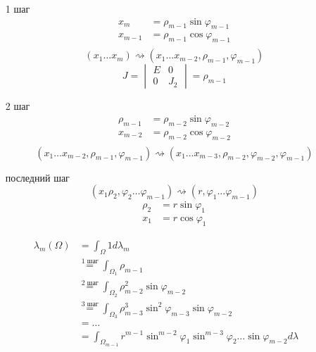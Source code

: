 \begin{itemize}
    \item [1 шаг] \begin{align*}
              x_m       & = \rho_{m - 1} \sin \varphi_{m - 1} \\
              x_{m - 1} & = \rho_{m - 1} \cos \varphi_{m - 1} \\
          \end{align*}
          \[(x_1 \dots x_m) \rightsquigarrow (x_1 \dots x_{m - 2}, \rho_{m - 1}, \varphi_{m - 1})\]
          \[J = \begin{vmatrix} E & 0 \\ 0 & J_2 \end{vmatrix} = \rho_{m - 1}\]
    \item [2 шаг] \begin{align*}
              \rho_{m - 1} & = \rho_{m - 2} \sin \varphi_{m - 2} \\
              x_{m - 2}    & = \rho_{m - 2} \cos \varphi_{m - 2} \\
          \end{align*}
          \[(x_1 \dots x_{m - 2}, \rho_{m - 1}, \varphi_{m - 1}) \rightsquigarrow (x_1 \dots x_{m - 3}, \rho_{m - 2}, \varphi_{m - 2}, \varphi_{m - 1})\]

    \item [последний шаг]
          \[(x_1 \rho_2, \varphi_2 \dots \varphi_{m - 1}) \rightsquigarrow (r, \varphi_1 \dots \varphi_{m - 1})\]
          \begin{align*}
              \rho_2 & = r \sin \varphi_1 \\
              x_1    & = r \cos \varphi_1
          \end{align*}
\end{itemize}

\begin{align*}
    \lambda_m(\Omega) & = \int_\Omega 1 d\lambda_m                                                                                        \\
                      & \stackrel{\text{1 шаг}}{=} \int_{\Omega_1} \rho_{m - 1}                                                           \\
                      & \stackrel{\text{2 шаг}}{=} \int_{\Omega_2} \rho^2_{m - 2} \sin \varphi_{m - 2}                                    \\
                      & \stackrel{\text{3 шаг}}{=} \int_{\Omega_3} \rho^3_{m - 3} \sin^2 \varphi_{m - 3} \sin \varphi_{m - 2}             \\
                      & = \dots                                                                                                           \\
                      & = \int_{\Omega_{m - 1}} r^{m - 1} \sin^{m - 2}\varphi_1 \sin^{m - 3}\varphi_2 \dots \sin \varphi_{m - 2} d\lambda
\end{align*}

